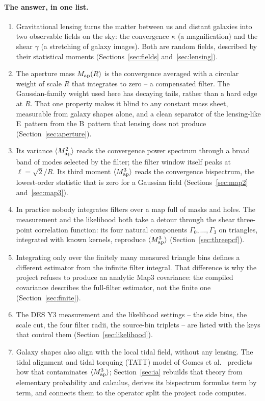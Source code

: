 \documentclass[11pt]{article}
\newcommand{\Map}{M_{\rm ap}}
\numberwithin{equation}{section}
\begin{document}
\paragraph{The answer, in one list.}
\begin{enumerate}
  \item Gravitational lensing turns the matter between us and distant
    galaxies into two observable fields on the sky: the convergence
    $\kappa$ (a magnification) and the shear $\gamma$ (a stretching of
    galaxy images).  Both are random fields, described by their
    statistical moments (Sections~\ref{sec:fields}
    and~\ref{sec:lensing}).
  \item The aperture mass $\Map(R)$ is the convergence averaged with a circular weight of scale $R$ that
    integrates to zero -- a compensated filter. The Gaussian-family
    weight used here has decaying tails, rather than a hard edge at $R$.  That one property makes it blind to any
    constant mass sheet, measurable from galaxy shapes alone, and a
    clean separator of the lensing-like E~pattern from the B~pattern
    that lensing does not produce (Section~\ref{sec:aperture}).
  \item Its variance $\langle\Map^2\rangle$ reads the convergence
    power spectrum through a broad band of modes selected by the filter;
    the filter window itself peaks at $\ell=\sqrt{2}/R$. Its third moment
    $\langle\Map^3\rangle$ reads the convergence bispectrum, the
    lowest-order statistic that is zero for a Gaussian field
    (Sections~\ref{sec:map2} and~\ref{sec:map3}).
  \item In practice nobody integrates filters over a map full of
    masks and holes.  The measurement and the likelihood both take a
    detour through the shear three-point correlation function: its
    four natural components $\Gamma_0,\ldots,\Gamma_3$ on triangles,
    integrated with known kernels, reproduce
    $\langle\Map^3\rangle$ (Section~\ref{sec:threepcf}).
  \item Integrating only over the finitely many measured triangle bins
    defines a different estimator from the infinite filter
    integral.  That difference is why the project refuses to produce
    an analytic Map3 covariance: the compiled covariance describes the
    full-filter estimator, not the finite one
    (Section~\ref{sec:finite}).
  \item The DES Y3 measurement and the likelihood settings -- the side
    bins, the scale cut, the four filter radii, the source-bin
    triplets -- are listed with the keys that control them
    (Section~\ref{sec:likelihood}).
  \item Galaxy shapes also align with the local tidal field, without
    any lensing.  The tidal alignment and tidal torquing (TATT) model
    of Gomes et al.~\cite{GomesTATT} predicts how that contaminates
    $\langle\Map^3\rangle$; Section~\ref{sec:ia} rebuilds that theory
    from elementary probability and calculus, derives its bispectrum
    formulas term by term, and connects them to the operator split the
    project code computes.
\end{enumerate}
\end{document}

